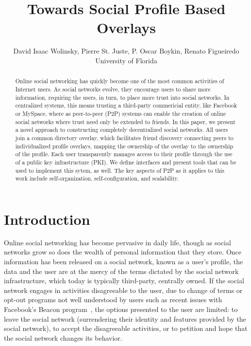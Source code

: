 \documentclass[conference]{IEEEtran}
\begin{document}
\title{Towards Social Profile Based Overlays}

\author{
David Isaac Wolinsky,
Pierre St. Juste,
P. Oscar Boykin,
Renato Figueiredo
\\
University of Florida
\\
}

\maketitle

\begin{abstract}
Online social networking has quickly become one of the most common activities of
Internet users.  As social networks evolve, they encourage users to share more
information, requiring the users, in turn, to place more trust into social
networks.  In centralized systems, this means trusting a third-party commericial
entity, like Facebook or MySpace, where as peer-to-peer (P2P) systems can enable
the creation of online social networks where trust need only be extended to
friends.  In this paper, we present a novel approach to constructing completely
decentralized social networks.  All users join a common directory overlay, which
facilitates friend discovery connecting peers to individualized profile overlays,
mapping the ownership of the overlay to the ownership of the profile.  Each user
transparently manages access to their profile through the use of a public key
infrastructure (PKI).  We define interfaces and present tools that can be used
to implement this sytem, as well.  The key aspects of P2P as it applies to this
work include self-organization, self-configuration, and scalability.
\end{abstract}

\section{Introduction}
Online social networking has become pervasive in daily life, though as social
networks grow so does the wealth of personal information that they store.  Once
information has been released on a social network, known as a user's profile,
the data and the user are at the mercy of the terms dictated by the social
network infrastructure, which today is typically third-party, centrally owned.
If the social network engages in activities disagreeable to the user, due to
change of terms or opt-out programs not well understood by users such as recent
issues with Facebook's Beacon program~\cite{facebook_beacon}, the options
presented to the user are limited: to leave the social network (surrendering
their identity and features provided by the social network), to accept the
disagreeable activities, or to petition and hope that the social network changes
its behavior. 
\end{document}
